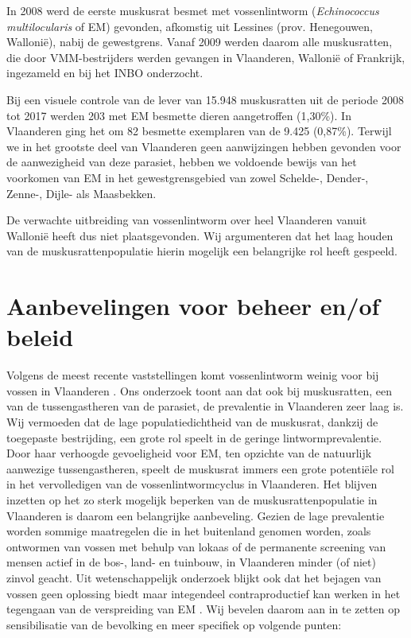 \documentclass[twoside]{extreport}
\begin{document}
In 2008 werd de eerste muskusrat besmet met vossenlintworm
(\emph{Echinococcus multilocularis} of EM) gevonden, afkomstig uit
Lessines (prov. Henegouwen, Wallonië), nabij de gewestgrens. Vanaf 2009
werden daarom alle muskusratten, die door VMM-bestrijders werden
gevangen in Vlaanderen, Wallonië of Frankrijk, ingezameld en bij het
INBO onderzocht.

Bij een visuele controle van de lever van 15.948 muskusratten uit de
periode 2008 tot 2017 werden 203 met EM besmette dieren aangetroffen
(1,30\%). In Vlaanderen ging het om 82 besmette exemplaren van de 9.425
(0,87\%). Terwijl we in het grootste deel van Vlaanderen geen
aanwijzingen hebben gevonden voor de aanwezigheid van deze parasiet,
hebben we voldoende bewijs van het voorkomen van EM in het
gewestgrensgebied van zowel Schelde-, Dender-, Zenne-, Dijle- als
Maasbekken.

De verwachte uitbreiding van vossenlintworm over heel Vlaanderen vanuit
Wallonië heeft dus niet plaatsgevonden. Wij argumenteren dat het laag
houden van de muskusrattenpopulatie hierin mogelijk een belangrijke rol
heeft gespeeld.

\chapter*{Aanbevelingen voor beheer en/of
beleid}\label{aanbevelingen-voor-beheer-enof-beleid}

Volgens de meest recente vaststellingen komt vossenlintworm weinig voor
bij vossen in Vlaanderen
\citep{vervaeke2012vossenlintworm, vervaeke2014geen, vervaeke2014bis}.
Ons onderzoek toont aan dat ook bij muskusratten, een van de
tussengastheren van de parasiet, de prevalentie in Vlaanderen zeer laag
is. Wij vermoeden dat de lage populatiedichtheid van de muskusrat,
dankzij de toegepaste bestrijding, een grote rol speelt in de geringe
lintwormprevalentie. Door haar verhoogde gevoeligheid voor EM, ten
opzichte van de natuurlijk aanwezige tussengastheren, speelt de
muskusrat immers een grote potentiële rol in het vervolledigen van de
vossenlintwormcyclus in Vlaanderen. Het blijven inzetten op het zo sterk
mogelijk beperken van de muskusrattenpopulatie in Vlaanderen is daarom
een belangrijke aanbeveling. Gezien de lage prevalentie worden sommige
maatregelen die in het buitenland genomen worden, zoals ontwormen van
vossen met behulp van lokaas of de permanente screening van mensen
actief in de bos-, land- en tuinbouw, in Vlaanderen minder (of niet)
zinvol geacht. Uit wetenschappelijk onderzoek blijkt ook dat het bejagen
van vossen geen oplossing biedt maar integendeel contraproductief kan
werken in het tegengaan van de verspreiding van EM
\citep{craig2017echinococcosis, comte2017echinococcus}. Wij bevelen
daarom aan in te zetten op sensibilisatie van de bevolking en meer
specifiek op volgende punten:
\end{document}
